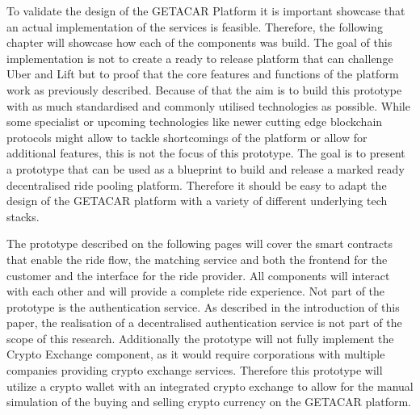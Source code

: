 To validate the design of the GETACAR Platform it is important showcase that an actual implementation of the services is feasible. Therefore, the following chapter will showcase how each of the components was build. The goal of this implementation is not to create a ready to release platform that can challenge Uber and Lift but to proof that the core features and functions of the platform work as previously described. Because of that the aim is to build this prototype with as much standardised and commonly utilised technologies as possible. While some specialist or upcoming technologies like newer cutting edge blockchain protocols might allow to tackle shortcomings of the platform or allow for additional features, this is not the focus of this prototype. The goal is to present a prototype that can be used as a blueprint to build and release a marked ready decentralised ride pooling platform. Therefore it should be easy to adapt the design of the GETACAR platform with a variety of different underlying tech stacks.

The prototype described on the following pages will cover the smart contracts that enable the ride flow, the matching service and both the frontend for the customer and the interface for the ride provider. All components will interact with each other and will provide a complete ride experience. Not part of the prototype is the authentication service. As described in the introduction of this paper, the realisation of a decentralised authentication service is not part of the scope of this research. Additionally the prototype will not fully implement the Crypto Exchange component, as it would require corporations with multiple companies providing crypto exchange services. Therefore this prototype will utilize a crypto wallet with an integrated crypto exchange to allow for the manual simulation of the buying and selling crypto currency on the GETACAR platform.
